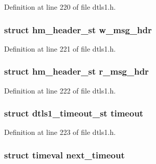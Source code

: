 Definition at line 220 of file dtls1.\+h.

\subsubsection[{\texorpdfstring{w\+\_\+msg\+\_\+hdr}{w_msg_hdr}}]{\setlength{\rightskip}{0pt plus 5cm}struct {\bf hm\+\_\+header\+\_\+st} w\+\_\+msg\+\_\+hdr}\hypertarget{structdtls1__state__st_a9c89ce6bcdd8f1fa5a0c08cf4a144fab}{}\label{structdtls1__state__st_a9c89ce6bcdd8f1fa5a0c08cf4a144fab}


Definition at line 221 of file dtls1.\+h.

\subsubsection[{\texorpdfstring{r\+\_\+msg\+\_\+hdr}{r_msg_hdr}}]{\setlength{\rightskip}{0pt plus 5cm}struct {\bf hm\+\_\+header\+\_\+st} r\+\_\+msg\+\_\+hdr}\hypertarget{structdtls1__state__st_a528ee70a8c3bef14e4642eb68ef2789a}{}\label{structdtls1__state__st_a528ee70a8c3bef14e4642eb68ef2789a}


Definition at line 222 of file dtls1.\+h.

\subsubsection[{\texorpdfstring{timeout}{timeout}}]{\setlength{\rightskip}{0pt plus 5cm}struct {\bf dtls1\+\_\+timeout\+\_\+st} timeout}\hypertarget{structdtls1__state__st_ab72af0e464da56aac628901682d8a443}{}\label{structdtls1__state__st_ab72af0e464da56aac628901682d8a443}


Definition at line 223 of file dtls1.\+h.

\subsubsection[{\texorpdfstring{next\+\_\+timeout}{next_timeout}}]{\setlength{\rightskip}{0pt plus 5cm}struct timeval next\+\_\+timeout}\hypertarget{structdtls1__state__st_a22ffd2a5e3eabfb4c818ea5c4ebfaa40}{}\label{structdtls1__state__st_a22ffd2a5e3eabfb4c818ea5c4ebfaa40}


